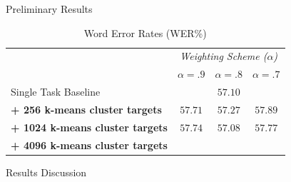 \documentclass[final]{beamer} %
\begin{document}
\begin{frame}
\begin{columns}
\begin{column}{0.3\textwidth}
{        \begin{block}{\boxnumber Preliminary Results}
          \begin{table}[!htbp]
            \centering
            \caption{Word Error Rates (WER\%)}
            \label{tab:results}
            \begin{adjustbox}{width=.9\textwidth}
              \begin{tabular}{lccc}
                \toprule
                & \multicolumn{3}{c}{ \textit{Weighting Scheme ($\alpha$)}}\\
                & $\alpha = .9 $ & $\alpha = .8 $ & $\alpha = .7 $\\
                \midrule
                Single Task Baseline  &  \multicolumn{3}{c}{$57.10 $ \raisebox{.33\height}{\footnotesize{$\pm 3.25$}}}     \\
                \textbf{+ 256 k-means cluster targets}  &  $57.71 $ \raisebox{.33\height}{\footnotesize{$\pm 1.59$}}   &  $57.27 $ \raisebox{.33\height}{\footnotesize{$\pm 1.60$}}     & $57.89 $ \raisebox{.33\height}{\footnotesize{$\pm 1.29$}} \\
                \textbf{+ 1024 k-means cluster targets}   & $57.74 $ \raisebox{.33\height}{\footnotesize{$\pm 3.17$}}    & $57.08 $ \raisebox{.33\height}{\footnotesize{$ \pm 2.62$}}    & $57.77 $ \raisebox{.33\height}{\footnotesize{$\pm .79$}}  \\
                \textbf{+ 4096 k-means cluster targets}   &      &      & \\
                \midrule
                \bottomrule
              \end{tabular}
            \end{adjustbox}
          \end{table}
        \end{block}
        
        \vspace{.5cm}
        
        \begin{block}{\boxnumber Results Discussion}
        \end{block}
        \vspace{.5cm}


}
\end{column}
\end{columns}
\end{frame}
\end{document}
